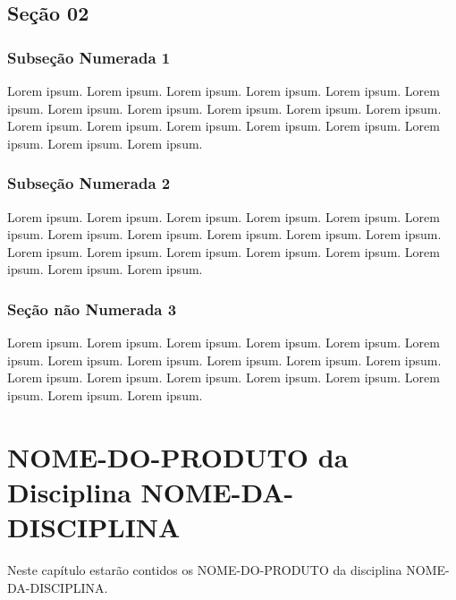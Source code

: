 \documentclass[
]{book}
\begin{document}
\hypertarget{seuxe7uxe3o-02}{%
\section{Seção 02}\label{seuxe7uxe3o-02}}

\hypertarget{subseuxe7uxe3o-numerada-1-1}{%
\subsection{Subseção Numerada 1}\label{subseuxe7uxe3o-numerada-1-1}}

Lorem ipsum. Lorem ipsum. Lorem ipsum. Lorem ipsum. Lorem ipsum. Lorem ipsum. Lorem ipsum. Lorem ipsum. Lorem ipsum. Lorem ipsum. Lorem ipsum. Lorem ipsum. Lorem ipsum. Lorem ipsum. Lorem ipsum. Lorem ipsum. Lorem ipsum. Lorem ipsum. Lorem ipsum.

\hypertarget{subseuxe7uxe3o-numerada-2-1}{%
\subsection{Subseção Numerada 2}\label{subseuxe7uxe3o-numerada-2-1}}

Lorem ipsum. Lorem ipsum. Lorem ipsum. Lorem ipsum. Lorem ipsum. Lorem ipsum. Lorem ipsum. Lorem ipsum. Lorem ipsum. Lorem ipsum. Lorem ipsum. Lorem ipsum. Lorem ipsum. Lorem ipsum. Lorem ipsum. Lorem ipsum. Lorem ipsum. Lorem ipsum. Lorem ipsum.

\hypertarget{seuxe7uxe3o-nuxe3o-numerada-3-1}{%
\subsection*{Seção não Numerada 3}\label{seuxe7uxe3o-nuxe3o-numerada-3-1}}

Lorem ipsum. Lorem ipsum. Lorem ipsum. Lorem ipsum. Lorem ipsum. Lorem ipsum. Lorem ipsum. Lorem ipsum. Lorem ipsum. Lorem ipsum. Lorem ipsum. Lorem ipsum. Lorem ipsum. Lorem ipsum. Lorem ipsum. Lorem ipsum. Lorem ipsum. Lorem ipsum. Lorem ipsum.

\hypertarget{nome-do-produto-da-disciplina-nome-da-disciplina-1}{%
\chapter{NOME-DO-PRODUTO da Disciplina NOME-DA-DISCIPLINA}\label{nome-do-produto-da-disciplina-nome-da-disciplina-1}}

Neste capítulo estarão contidos os NOME-DO-PRODUTO da disciplina NOME-DA-DISCIPLINA.
\end{document}
